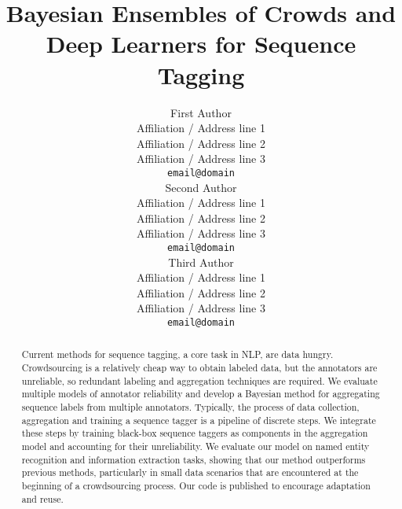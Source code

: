 \documentclass[11pt,a4paper]{article}
\title{Bayesian Ensembles of Crowds and Deep Learners for Sequence Tagging}%
\author{First Author \\
  Affiliation / Address line 1 \\
  Affiliation / Address line 2 \\
  Affiliation / Address line 3 \\
  {\tt email@domain} \\\And
  Second Author \\
  Affiliation / Address line 1 \\
  Affiliation / Address line 2 \\
  Affiliation / Address line 3 \\
  {\tt email@domain} \\\And
  Third Author \\
  Affiliation / Address line 1 \\
  Affiliation / Address line 2 \\
  Affiliation / Address line 3 \\
  {\tt email@domain} \\
}
\begin{document}
\maketitle


\begin{abstract}
Current methods for sequence tagging, a core task in NLP, are data hungry.
Crowdsourcing is a relatively cheap way to obtain labeled data, but
the annotators are unreliable, so redundant labeling
and aggregation techniques are required.
We evaluate multiple models of annotator reliability and develop
 a Bayesian method for aggregating sequence labels from multiple annotators.
Typically, the process of data collection, aggregation and training a sequence tagger 
is a pipeline of discrete steps.
We integrate these steps by training black-box sequence taggers as components in the aggregation model and
accounting for their unreliability.
We evaluate our model on named entity recognition and information extraction tasks,
showing that our method outperforms previous methods, particularly in small data scenarios that
are encountered at the beginning of a crowdsourcing process.
Our code is published to encourage adaptation and reuse.



\end{abstract}
\end{document}
